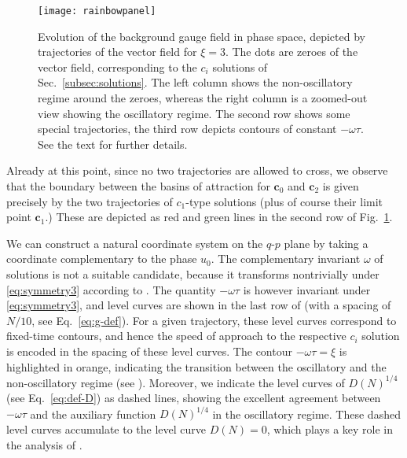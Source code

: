 \begin{figure}
\centering{}\texttt{[image: rainbowpanel]} \caption{\label{fig:trajectories-panel} Evolution of the background gauge field in phase space, depicted by trajectories of the vector field  for $\xi=3$. The dots are zeroes of the vector field, corresponding to the $c_{i}$ solutions of Sec.~\ref{subsec:solutions}. The left column shows the non-oscillatory regime around the zeroes, whereas the right column is a zoomed-out view showing the oscillatory regime. The second row shows some special trajectories, the third row depicts contours of constant $-\omega\tau$. See the text for further details.}
\end{figure}

Already at this point, since no two trajectories are allowed to cross, we observe that the boundary between the basins of attraction for $\mathbf{c}_{0}$ and $\mathbf{c}_{2}$ is given precisely by the two trajectories of $c_{1}$\nobreakdash-type solutions (plus of course their limit point $\mathbf{c}_{1}$.) These are depicted as red and green lines in the second row of Fig.~\ref{fig:trajectories-panel}.

We can construct a natural coordinate system on the $q$-$p$ plane by taking a coordinate complementary to the phase $u_{0}$. The complementary invariant $\omega$ of solutions is not a suitable candidate, because it transforms nontrivially under \eqref{eq:symmetry3} according to . The quantity $-\omega\tau$ is however invariant under \eqref{eq:symmetry3}, and level curves are shown in the last row of  (with a spacing of $N/10$, see Eq.~\eqref{eq:g-def}). For a given trajectory, these level curves correspond to fixed-time contours, and hence the speed of approach to the respective $c_{i}$ solution is encoded in the spacing of these level curves. The contour $-\omega\tau=\xi$ is highlighted in orange, indicating the transition between the oscillatory and the non-oscillatory regime (see ). Moreover, we indicate the level curves of $D(N)^{1/4}$ (see Eq.~\eqref{eq:def-D}) as dashed lines, showing the excellent agreement between $-\omega\tau$ and the auxiliary function $D(N)^{1/4}$ in the oscillatory regime. These dashed level curves accumulate to the level curve $D(N)=0$, which plays a key role in the analysis of .

